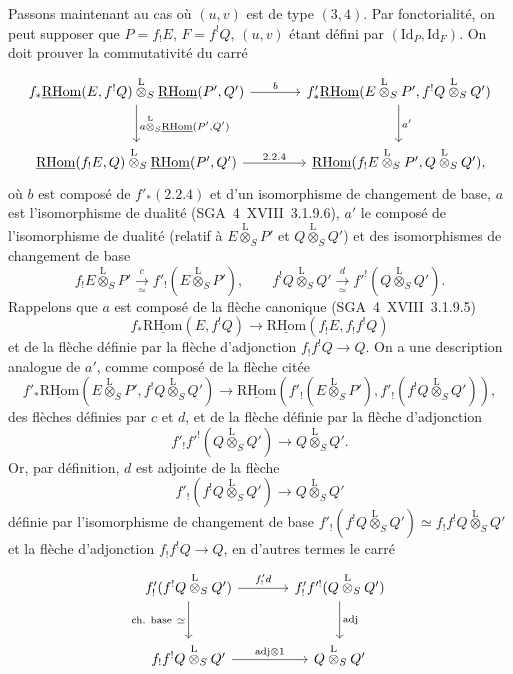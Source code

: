 \documentclass[11pt]{article}
\newcommand{\R}{\mathrm{R}}\newcommand{\RHomCore}{\mathrm{RHom}}
\providecommand{\RHom}{\RHomCore}
\providecommand{\uRHom}{\underline{\RHom}}
\providecommand{\Id}{\mathrm{Id}}
\providecommand{\RHom}{\RHomCore}
\providecommand{\RHom}{\R\mathcal{H}om}
\providecommand{\R}{\mathrm R}
\providecommand{\RHom}{\RHomCore}
\begin{document}
Passons maintenant au cas où $(u,v)$ est de type $(3,4)$. Par fonctorialité, on peut supposer que $P=f_{!}E$, $F=f^{!}Q$, $(u,v)$ étant défini par $(\Id_P,\Id_F)$. On doit prouver la commutativité du carré
\[
\begin{tikzcd}[
column sep=large,row sep=large]
f_*\uRHom(E,f^!Q)\overset{\mathrm{L}}{\otimes}_S\uRHom(P',Q') \arrow[r,"b"] \arrow[d,"{a\overset{\mathrm{L}}{\otimes}_S\uRHom(P',Q')}"] & f'_*\uRHom(E\overset{\mathrm{L}}{\otimes}_SP',f^!Q\overset{\mathrm{L}}{\otimes}_SQ') \arrow[d,"a'"]\\
\uRHom(f_!E,Q)\overset{\mathrm{L}}{\otimes}_S\uRHom(P',Q') \arrow[r,"2.2.4"] & \uRHom(f_!E\overset{\mathrm{L}}{\otimes}_SP',Q\overset{\mathrm{L}}{\otimes}_SQ'),
\end{tikzcd}
\]
où $b$ est composé de $f'_*(2.2.4)$ et d'un isomorphisme de changement de base, $a$ est l'isomorphisme de dualité (SGA~4~XVIII~3.1.9.6), $a'$ le composé de l'isomorphisme de dualité (relatif à $E\overset{\mathrm{L}}{\otimes}_SP'$ et $Q\overset{\mathrm{L}}{\otimes}_SQ'$) et des isomorphismes de changement de base
\[
f_!E\overset{\mathrm{L}}{\otimes}_SP'\xrightarrow[\simeq]{c}f'_!(E\overset{\mathrm{L}}{\otimes}_SP'),
\qquad
f^!Q\overset{\mathrm{L}}{\otimes}_SQ'\xrightarrow[\simeq]{d}f'^!(Q\overset{\mathrm{L}}{\otimes}_SQ').
\]
Rappelons que $a$ est composé de la flèche canonique (SGA~4~XVIII~3.1.9.5)
\[
f_*\uRHom(E,f^!Q)\longrightarrow\uRHom(f_!E,f_!f^!Q)
\]
et de la flèche définie par la flèche d'adjonction $f_!f^!Q\to Q$. On a une description analogue de $a'$, comme composé de la flèche citée
\begin{equation}\tag{*}
f'_*\uRHom(E\overset{\mathrm{L}}{\otimes}_SP',f^!Q\overset{\mathrm{L}}{\otimes}_SQ')\longrightarrow
\uRHom(f'_!(E\overset{\mathrm{L}}{\otimes}_SP'),f'_!(f^!Q\overset{\mathrm{L}}{\otimes}_SQ')),
\end{equation}
des flèches définies par $c$ et $d$, et de la flèche définie par la flèche d'adjonction
\[
f'_!f'^!(Q\overset{\mathrm{L}}{\otimes}_SQ')\longrightarrow Q\overset{\mathrm{L}}{\otimes}_SQ'.
\]
Or, par définition, $d$ est adjointe de la flèche
\[
f'_!(f^!Q\overset{\mathrm{L}}{\otimes}_SQ')\longrightarrow Q\overset{\mathrm{L}}{\otimes}_SQ'
\]
définie par l'isomorphisme de changement de base $f'_!(f^!Q\overset{\mathrm{L}}{\otimes}_SQ')\simeq f_!f^!Q\overset{\mathrm{L}}{\otimes}_SQ'$ et la flèche d'adjonction $f_!f^!Q\to Q$, en d'autres termes le carré
\[
\begin{tikzcd}[column sep=large,row sep=large]
f'_!(f^!Q\overset{\mathrm{L}}{\otimes}_SQ') \arrow[r,"{f'_!d}"] \arrow[d,"{\text{ch. base}\ \simeq}"'] & f'_!f'^!(Q\overset{\mathrm{L}}{\otimes}_SQ') \arrow[d,"\mathrm{adj}"]\\
f_!f^!Q\overset{\mathrm{L}}{\otimes}_SQ' \arrow[r,"{\mathrm{adj}\otimes 1}"] & Q\overset{\mathrm{L}}{\otimes}_SQ'
\end{tikzcd}
\]
\end{document}
